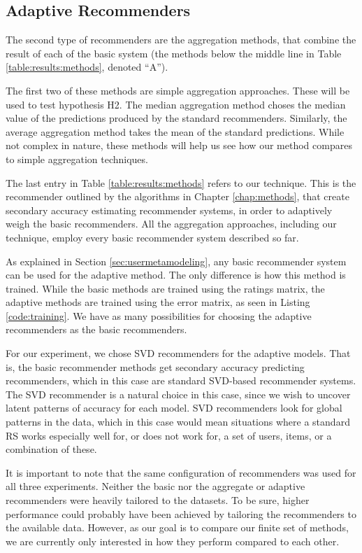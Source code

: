 \subsection{Adaptive Recommenders}

The second type of recommenders are the aggregation methods, 
that combine the result of each of the basic system
(the methods below the middle line in Table \ref{table:results:methods},
denoted ``A'').

The first two of these methods are simple aggregation approaches.
These will be used to test hypothesis H2.
The median aggregation method choses the median value of the predictions
produced by the standard recommenders.
Similarly, the average aggregation method takes the mean of the
standard predictions.
While not complex in nature, these methods
will help us see how our method compares to simple aggregation techniques.

The last entry in Table \ref{table:results:methods}
refers to our technique. 
This is the recommender outlined by the algorithms
in Chapter \ref{chap:methods},
that create secondary accuracy estimating recommender systems,
in order to adaptively weigh the basic recommenders.
All the aggregation approaches, including our technique,
employ every basic recommender system described so far.

As explained in Section \ref{sec:usermetamodeling},
any basic recommender system can be used for the adaptive method.
The only difference is how this method is trained.
While the basic methods are trained using the ratings matrix,
the adaptive methods are trained using the error matrix,
as seen in Listing \ref{code:training}.
We have as many possibilities for choosing
the adaptive recommenders as the basic recommenders.

For our experiment, we chose SVD recommenders for the adaptive models.
That is, the basic recommender methods get secondary 
accuracy predicting recommenders, which in this case are standard SVD-based recommender systems.
The SVD recommender is a natural choice in this case,
since we wish to uncover latent patterns of accuracy for each model.
SVD recommenders look for global patterns in the data,
which in this case would mean situations where a standard RS
works especially well for, or does not work for,
a set of users, items, or a combination of these.

It is important to note that the same configuration of recommenders was used for all three experiments.
Neither the basic nor the aggregate or adaptive recommenders were heavily tailored
to the datasets. To be sure, higher performance could probably have been achieved
by tailoring the recommenders to the available data. 
However, as our goal is to compare our finite set of methods, 
we are currently only interested in how they perform compared to each other.

